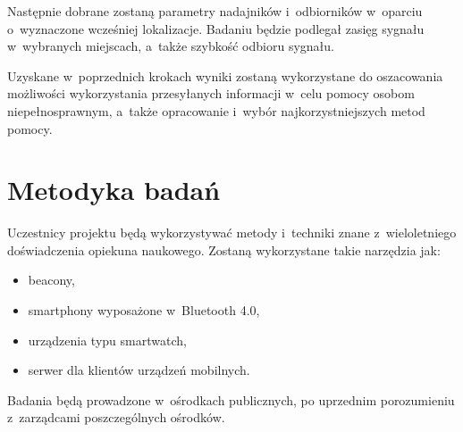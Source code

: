 \documentclass[a4paper]{article}
\begin{document}
Następnie dobrane zostaną parametry nadajników i~odbiorników w~oparciu o~wyznaczone wcześniej lokalizacje. Badaniu będzie podlegał zasięg sygnału w~wybranych miejscach, a~także szybkość odbioru sygnału. 

Uzyskane w~poprzednich krokach wyniki zostaną wykorzystane do oszacowania możliwości wykorzystania przesyłanych informacji w~celu pomocy osobom niepełnosprawnym, a~także opracowanie i~wybór najkorzystniejszych metod pomocy.

\section{Metodyka badań}
Uczestnicy projektu będą wykorzystywać metody i~techniki znane z~wieloletniego doświadczenia opiekuna naukowego. Zostaną wykorzystane takie narzędzia jak:
\begin{itemize}
\item beacony,
\item smartphony wyposażone w~Bluetooth 4.0,
\item urządzenia typu smartwatch,
\item serwer dla klientów urządzeń mobilnych.
\end{itemize} 

Badania będą prowadzone w~ośrodkach publicznych, po uprzednim porozumieniu z~zarządcami poszczególnych ośrodków.
\end{document}
